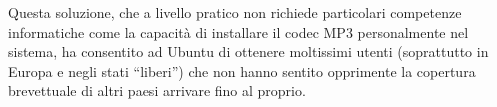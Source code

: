 Questa soluzione, che a livello pratico non richiede particolari competenze informatiche come la capacità di installare il codec MP3 personalmente nel sistema, ha consentito ad Ubuntu di ottenere moltissimi utenti (soprattutto in Europa e negli stati ``liberi'') che non hanno sentito opprimente la copertura brevettuale di altri paesi arrivare fino al proprio.
